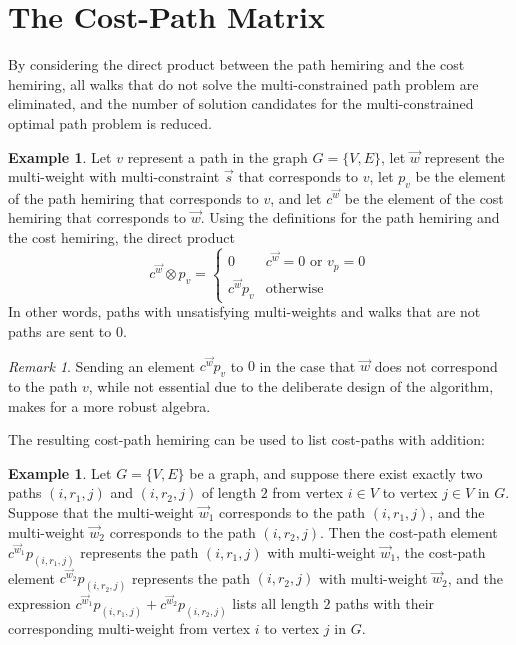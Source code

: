 \documentclass[12pt]{amsart}
\theoremstyle{definition}
\newtheorem{example}[thm]{Example}
\theoremstyle{remark}
\newtheorem{remark}[thm]{Remark}
\numberwithin{equation}{section}
\begin{document}
\section{The Cost-Path Matrix}

By considering the direct product between the path hemiring and the cost hemiring, all walks that do not solve the multi-constrained path problem are eliminated, and the number of solution candidates for the multi-constrained optimal path problem is reduced.

\begin{example}
Let $v$ represent a path in the graph $G = \{V,E\}$, let $\vec{w}$ represent the multi-weight with multi-constraint $\vec{s}$ that corresponds to $v$, let $p_v$ be the element of the path hemiring that corresponds to $v$, and let $c^{\vec{w}}$ be the element of the cost hemiring that corresponds to $\vec{w}$. Using the definitions for the path hemiring and the cost hemiring, the direct product
$$
	c^{\vec{w}} \otimes p_v = \left\{
		\begin{array}{ll}
			0 & c^{\vec{w}} = 0 \text{ or } v_p = 0 \\
			c^{\vec{w}} p_v & \text{otherwise}
		\end{array}
	\right.
$$
In other words, paths with unsatisfying multi-weights and walks that are not paths are sent to $0$.
\end{example}

\begin{remark}
Sending an element $c^{\vec{w}} p_v$ to $0$ in the case that $\vec{w}$ does not correspond to the path $v$, while not essential due to the deliberate design of the algorithm, makes for a more robust algebra.
\end{remark}

The resulting cost-path hemiring can be used to list cost-paths with addition:

\begin{example}
Let $G = \{V,E\}$ be a graph, and suppose there exist exactly two paths $(i, r_1, j)$ and $(i, r_2, j)$ of length $2$ from vertex $i \in V$ to vertex $j \in V$ in $G$. Suppose that the multi-weight $\vec{w}_1$ corresponds to the path $(i, r_1, j)$, and the multi-weight $\vec{w}_2$ corresponds to the path $(i, r_2, j)$. Then the cost-path element $c^{\vec{w}_1} p_{(i, r_1, j)}$ represents the path $(i, r_1, j)$ with multi-weight $\vec{w}_1$, the cost-path element $c^{\vec{w}_2} p_{(i, r_2, j)}$ represents the path $(i, r_2, j)$ with multi-weight $\vec{w}_2$, and the expression $c^{\vec{w}_1} p_{(i, r_1, j)} + c^{\vec{w}_2} p_{(i, r_2, j)}$ lists all length $2$ paths with their corresponding multi-weight from vertex $i$ to vertex $j$ in $G$.
\end{example}
\end{document}
